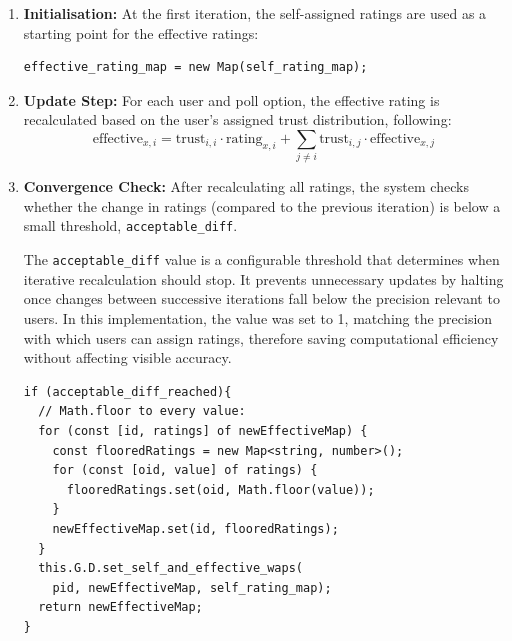 \begin{enumerate}
    \item \textbf{Initialisation:} At the first iteration, the self-assigned ratings are used as a starting point for the effective ratings:
    \begin{verbatim}
effective_rating_map = new Map(self_rating_map);
    \end{verbatim}
    \item \textbf{Update Step:} For each user and poll option, the effective rating is recalculated based on the user's assigned trust distribution, following:
    \begin{equation}
      \text{effective}_{x, i} = \text{trust}_{i,i} \cdot \text{rating}_{x,i} + \sum_{j \neq i} \text{trust}_{i,j} \cdot \text{effective}_{x,j}
      \label{eq:effective_rating}
    \end{equation}      
    \item \textbf{Convergence Check:} After recalculating all ratings, the system checks whether the change in ratings (compared to the previous iteration) is below a small threshold, \texttt{acceptable\_diff}.

The \texttt{acceptable\_diff} value is a configurable threshold that determines when iterative recalculation should stop. It prevents unnecessary updates by halting once changes between successive iterations fall below the precision relevant to users. In this implementation, the value was set to 1, matching the precision with which users can assign ratings, therefore saving computational efficiency without affecting visible accuracy.

\begin{verbatim}
if (acceptable_diff_reached){
  // Math.floor to every value:
  for (const [id, ratings] of newEffectiveMap) {
    const flooredRatings = new Map<string, number>();
    for (const [oid, value] of ratings) {
      flooredRatings.set(oid, Math.floor(value));
    }
    newEffectiveMap.set(id, flooredRatings);
  }
  this.G.D.set_self_and_effective_waps(
    pid, newEffectiveMap, self_rating_map);
  return newEffectiveMap;
}
\end{verbatim}
\end{enumerate}

